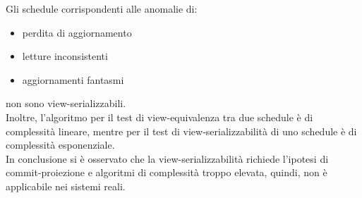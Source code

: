 Gli schedule corrispondenti alle anomalie di:
\begin{itemize}[label=$\diamond$, itemsep=\smallskipamount]
    \item perdita di aggiornamento
    \item letture inconsistenti
    \item aggiornamenti fantasmi
\end{itemize}

non sono view-serializzabili.\\[0.2ex]
Inoltre, l'algoritmo per il test di view-equivalenza tra due schedule è di complessità lineare, mentre per il test di view-serializzabilità di uno schedule è di complessità esponenziale.\\[0.2ex]
In conclusione si è osservato che la view-serializzabilità richiede l'ipotesi di commit-proiezione e algoritmi di complessità troppo elevata, quindi, non è applicabile nei sistemi reali.

